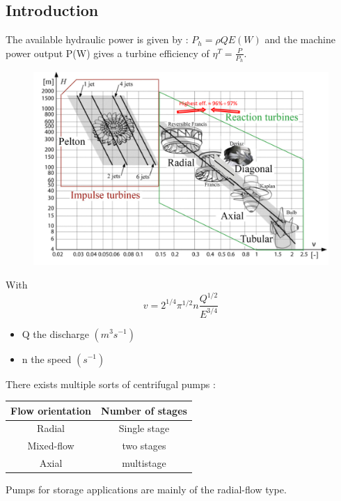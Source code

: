 \documentclass[../main.tex]{subfiles}
\begin{document}
\localtableofcontents

\subsection{Introduction}
The available hydraulic power is given by : $P_h = \rho Q E (W)$ and the machine power output P(W) gives a turbine efficiency of $\eta^T = \frac{P}{P_h}$.\\

\begin{figure}[hbt!]
    \centering
    \includegraphics[width=0.8\linewidth]{IMAGES/Hydraulic/Hydrau1.png}
\end{figure}
With \begin{equation}
    v = 2^{1/4} \pi^{1/2} n \frac{Q^{1/2}}{E^{3/4}}
\end{equation}
\begin{itemize}
    \item Q the discharge $(m^3 s^{-1})$\\
    \item n the speed $(s^{-1})$\\
\end{itemize}

There exists multiple sorts of centrifugal pumps : \begin{table}[hbt!]
    \centering
    \begin{tabular}{c|c}
         Flow orientation & Number of stages \\ \hline
        Radial & Single stage\\
        Mixed-flow & two stages\\
        Axial & multistage\\
    \end{tabular}
\end{table}
Pumps for storage applications are mainly of the radial-flow type.
\end{document}
